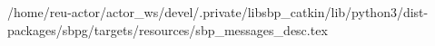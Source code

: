 /home/reu-actor/actor_ws/devel/.private/libsbp_catkin/lib/python3/dist-packages/sbpg/targets/resources/sbp_messages_desc.tex